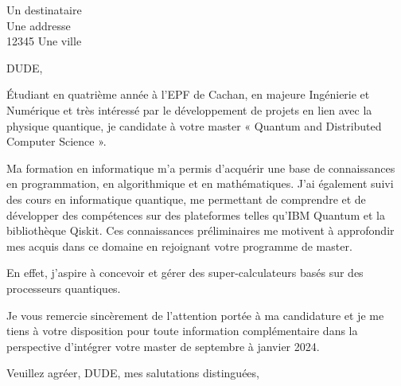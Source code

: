 \documentclass[12pt]{lettre}
\begin{document}
    \begin{letter}{Un destinataire\\Une addresse\\12345 Une ville}

        \def\concname{Objet :~} %
        \opening{DUDE,}

        Étudiant en quatrième année à l’EPF de Cachan, en majeure Ingénierie et Numérique et très intéressé
        par le développement de projets en lien avec la physique quantique,
        je candidate à votre master « Quantum and Distributed Computer Science ».

        Ma formation en informatique m'a permis d'acquérir une base de connaissances en programmation,
        en algorithmique et en mathématiques.
        J'ai également suivi des cours en informatique quantique, me permettant de comprendre et de développer des compétences
        sur des plateformes telles qu'IBM Quantum et la bibliothèque Qiskit.
        Ces connaissances préliminaires me motivent à approfondir mes acquis dans ce domaine
        en rejoignant votre programme de master.

        En effet, j'aspire à concevoir et gérer des super-calculateurs basés sur des processeurs quantiques.

        Je vous remercie sincèrement de l'attention portée à ma candidature et
        je me tiens à votre disposition pour toute information complémentaire dans la perspective
        d'intégrer votre master de septembre à janvier 2024.

        \closing{Veuillez agréer, DUDE, mes salutations distinguées,}

    \end{letter}
\end{document}
